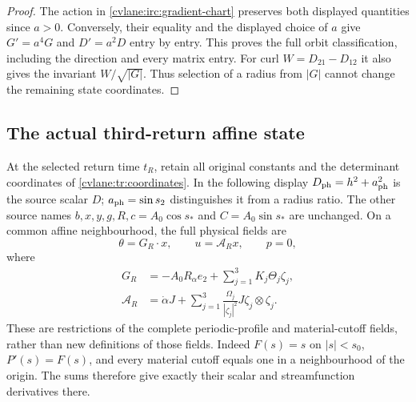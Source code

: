 \begin{proof}
The action in \eqref{cvlane:irc:gradient-chart} preserves both displayed
quantities since $a>0$.  Conversely, their equality and the displayed
choice of $a$ give $G'=a^4G$ and $D'=a^2D$ entry by entry.
This proves the full orbit classification, including the direction
and every matrix entry.  For curl $W=D_{21}-D_{12}$ it also gives the
invariant $W/\sqrt{|G|}$.  Thus selection of a radius from $|G|$
cannot change the remaining state coordinates.
\end{proof}

\subsection{The actual third-return affine state}

At the selected return time $t_R$, retain all original constants and
the determinant coordinates of \eqref{cvlane:tr:coordinates}.  In the
following display $D_{\rm ph}=h^2+a_{\rm ph}^2$ is the source scalar
$D$; $a_{\rm ph}=\sin s_2$ distinguishes it from a radius ratio.
The other source names $b,x,y,g,R,c=A_0\cos s_*$ and
$C=A_0\sin s_*$ are unchanged.  On a common affine neighbourhood,
the full physical fields are
\begin{equation}\label{cvlane:irc:return-field}
 \theta=G_R\cdot x,\qquad u=\mathcal A_Rx,\qquad p=0,
\end{equation}
where
\begin{align}
 G_R&=-A_0R_\alpha e_2+
       \sum_{j=1}^3K_j\Theta_j\zeta_j,
 \label{cvlane:irc:return-G}\\
 \mathcal A_R&=\dot\alpha J+
       \sum_{j=1}^3\frac{\Omega_j}{|\zeta_j|^2}
                 J\zeta_j\otimes\zeta_j.
 \label{cvlane:irc:return-D}
\end{align}
These are restrictions of the complete periodic-profile and
material-cutoff fields, rather than new definitions of those fields.
Indeed $F(s)=s$ on $|s|<s_0$, $P'(s)=F(s)$, and every material cutoff
equals one in a neighbourhood of the origin.  The sums therefore
give exactly their scalar and streamfunction derivatives there.

